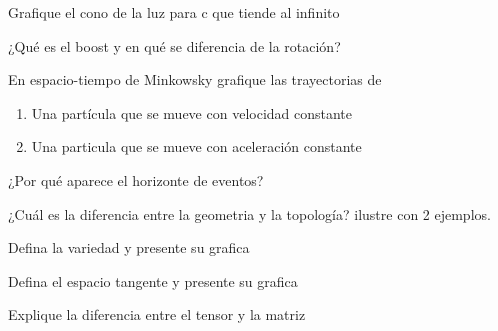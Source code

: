 \documentclass[12pt,a4paper]{practice}
\begin{document}
    \begin{problem}\label{prob:7}
        Grafique el cono de la luz para c que tiende al infinito    
    \end{problem}

    \begin{problem}\label{prob:8}
        ¿Qué es el boost y en qué se diferencia de la rotación?
    \end{problem}

    \begin{problem}\label{prob:9}
        En espacio-tiempo de Minkowsky grafique las trayectorias de
            \begin{enumerate}[label=\alph*)]
                \item Una partícula que se mueve con velocidad constante
                \item Una particula que se mueve con aceleración constante
             \end{enumerate}  
    \end{problem}
    
    \begin{problem}\label{prob:10}
        ¿Por qué aparece el horizonte de eventos?    
    \end{problem}
    
    \begin{problem}\label{prob:11}
        ¿Cuál es la diferencia entre la geometria y la topología? ilustre con 2 ejemplos.
    \end{problem}
    
    \begin{problem}\label{prob:12}
        Defina la variedad y presente su grafica    
    \end{problem}
    
    \begin{problem}\label{prob:13}
        Defina el espacio tangente y presente su grafica
    \end{problem}
    
    \begin{problem}\label{prob:14}
        Explique la diferencia entre el tensor y la matriz
    \end{problem}
\end{document}
